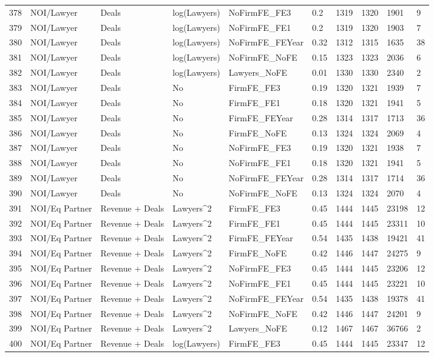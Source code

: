 \begin{table}[ht]
\begin{tabular}{rlllllllll}
  378 & NOI/Lawyer & Deals & log(Lawyers) & NoFirmFE\_FE3 & 0.2 & 1319 & 1320 & 1901 & 9 \\ 
  379 & NOI/Lawyer & Deals & log(Lawyers) & NoFirmFE\_FE1 & 0.2 & 1319 & 1320 & 1903 & 7 \\ 
  380 & NOI/Lawyer & Deals & log(Lawyers) & NoFirmFE\_FEYear & 0.32 & 1312 & 1315 & 1635 & 38 \\ 
  381 & NOI/Lawyer & Deals & log(Lawyers) & NoFirmFE\_NoFE & 0.15 & 1323 & 1323 & 2036 & 6 \\ 
  382 & NOI/Lawyer & Deals & log(Lawyers) & Lawyers\_NoFE & 0.01 & 1330 & 1330 & 2340 & 2 \\ 
  383 & NOI/Lawyer & Deals & No & FirmFE\_FE3 & 0.19 & 1320 & 1321 & 1939 & 7 \\ 
  384 & NOI/Lawyer & Deals & No & FirmFE\_FE1 & 0.18 & 1320 & 1321 & 1941 & 5 \\ 
  385 & NOI/Lawyer & Deals & No & FirmFE\_FEYear & 0.28 & 1314 & 1317 & 1713 & 36 \\ 
  386 & NOI/Lawyer & Deals & No & FirmFE\_NoFE & 0.13 & 1324 & 1324 & 2069 & 4 \\ 
  387 & NOI/Lawyer & Deals & No & NoFirmFE\_FE3 & 0.19 & 1320 & 1321 & 1938 & 7 \\ 
  388 & NOI/Lawyer & Deals & No & NoFirmFE\_FE1 & 0.18 & 1320 & 1321 & 1941 & 5 \\ 
  389 & NOI/Lawyer & Deals & No & NoFirmFE\_FEYear & 0.28 & 1314 & 1317 & 1714 & 36 \\ 
  390 & NOI/Lawyer & Deals & No & NoFirmFE\_NoFE & 0.13 & 1324 & 1324 & 2070 & 4 \\ 
  391 & NOI/Eq Partner & Revenue + Deals & Lawyers^2 & FirmFE\_FE3 & 0.45 & 1444 & 1445 & 23198 & 12 \\ 
  392 & NOI/Eq Partner & Revenue + Deals & Lawyers^2 & FirmFE\_FE1 & 0.45 & 1444 & 1445 & 23311 & 10 \\ 
  393 & NOI/Eq Partner & Revenue + Deals & Lawyers^2 & FirmFE\_FEYear & 0.54 & 1435 & 1438 & 19421 & 41 \\ 
  394 & NOI/Eq Partner & Revenue + Deals & Lawyers^2 & FirmFE\_NoFE & 0.42 & 1446 & 1447 & 24275 & 9 \\ 
  395 & NOI/Eq Partner & Revenue + Deals & Lawyers^2 & NoFirmFE\_FE3 & 0.45 & 1444 & 1445 & 23206 & 12 \\ 
  396 & NOI/Eq Partner & Revenue + Deals & Lawyers^2 & NoFirmFE\_FE1 & 0.45 & 1444 & 1445 & 23221 & 10 \\ 
  397 & NOI/Eq Partner & Revenue + Deals & Lawyers^2 & NoFirmFE\_FEYear & 0.54 & 1435 & 1438 & 19378 & 41 \\ 
  398 & NOI/Eq Partner & Revenue + Deals & Lawyers^2 & NoFirmFE\_NoFE & 0.42 & 1446 & 1447 & 24201 & 9 \\ 
  399 & NOI/Eq Partner & Revenue + Deals & Lawyers^2 & Lawyers\_NoFE & 0.12 & 1467 & 1467 & 36766 & 2 \\ 
  400 & NOI/Eq Partner & Revenue + Deals & log(Lawyers) & FirmFE\_FE3 & 0.45 & 1444 & 1445 & 23347 & 12 \\ 
   \hline
\end{tabular}
\end{table}
